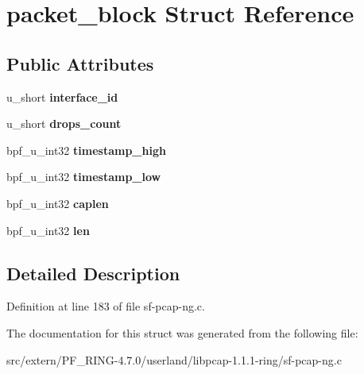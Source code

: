 \hypertarget{structpacket__block}{
\section{packet\_\-block Struct Reference}
\label{structpacket__block}
}
\subsection*{Public Attributes}
\begin{DoxyCompactItemize}
\item 
\hypertarget{structpacket__block_ae0d1226a1cbe6cb1fc865e63ef2a54d5}{
u\_\-short {\bfseries interface\_\-id}}
\label{structpacket__block_ae0d1226a1cbe6cb1fc865e63ef2a54d5}

\item 
\hypertarget{structpacket__block_a1c3dc0f2b9a53b99c58c997e83d566b1}{
u\_\-short {\bfseries drops\_\-count}}
\label{structpacket__block_a1c3dc0f2b9a53b99c58c997e83d566b1}

\item 
\hypertarget{structpacket__block_a2aa03d364d3fdd2385b45aa322e2faf7}{
bpf\_\-u\_\-int32 {\bfseries timestamp\_\-high}}
\label{structpacket__block_a2aa03d364d3fdd2385b45aa322e2faf7}

\item 
\hypertarget{structpacket__block_a6270fd9a7ee137d8efb2c4721ed90075}{
bpf\_\-u\_\-int32 {\bfseries timestamp\_\-low}}
\label{structpacket__block_a6270fd9a7ee137d8efb2c4721ed90075}

\item 
\hypertarget{structpacket__block_a5fbff685ec0f044e0657bd4fcb958b24}{
bpf\_\-u\_\-int32 {\bfseries caplen}}
\label{structpacket__block_a5fbff685ec0f044e0657bd4fcb958b24}

\item 
\hypertarget{structpacket__block_a7bf904de0a5b63cb471e82433ddf2afa}{
bpf\_\-u\_\-int32 {\bfseries len}}
\label{structpacket__block_a7bf904de0a5b63cb471e82433ddf2afa}

\end{DoxyCompactItemize}


\subsection{Detailed Description}


Definition at line 183 of file sf-\/pcap-\/ng.c.



The documentation for this struct was generated from the following file:\begin{DoxyCompactItemize}
\item 
src/extern/PF\_\-RING-\/4.7.0/userland/libpcap-\/1.1.1-\/ring/sf-\/pcap-\/ng.c\end{DoxyCompactItemize}
